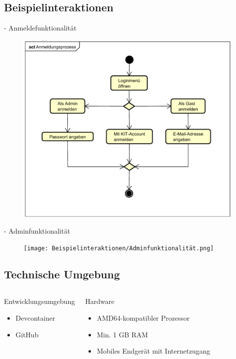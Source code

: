 \documentclass{sdqbeamer}
\begin{document}
\subsection{Beispielinteraktionen} 
\begin{frame}{{\insertsubsectionhead} - Anmeldefunktionalität}
    \begin{figure}
        \centering
        \includegraphics[width=0.5\linewidth]{Beispielinteraktionen/Anmeldung.png}
        \label{fig:enter-label}
    \end{figure}
\end{frame}

\begin{frame}{{\insertsubsectionhead} - Adminfunktionalität}
    \begin{figure}
        \centering
        \texttt{[image: Beispielinteraktionen/Adminfunktionalität.png]}
        \label{fig:enter-label}
    \end{figure}
\end{frame}

\subsection{Technische Umgebung}

\begin{frame}{\insertsubsectionhead}
    \begin{columns}
        \begin{greenblock}{Entwicklungsumgebung}
            \begin{itemize}
                \item Devcontainer
                \item GitHub
            \end{itemize}
        \end{greenblock}
        \begin{greenblock}{Hardware}
            \begin{itemize}
                \item AMD64-kompatibler Prozessor
                \item Min. 1 GB RAM
                \item Mobiles Endgerät mit Internetzugang
            \end{itemize}
        \end{greenblock}
    \end{columns}
\end{frame}
\end{document}
